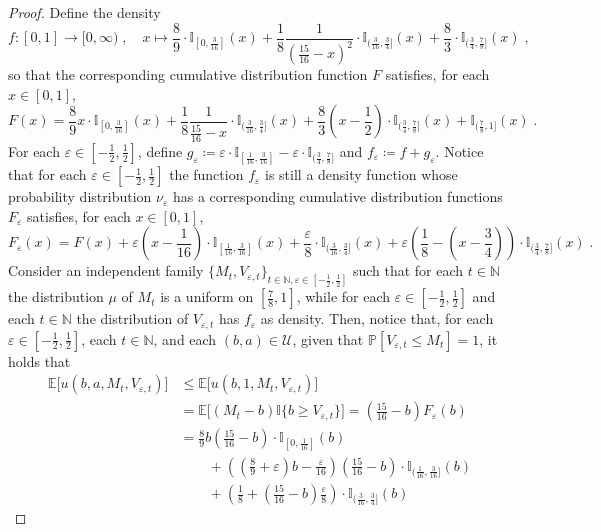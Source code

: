 \documentclass[final,12pt]{colt2025}
\newcommand{\cA}{\mathcal{A}}
\newcommand{\cS}{\mathcal{S}}
\newcommand{\cU}{\mathcal{U}}
\newcommand{\E}{\mathbb{E}}
\newcommand{\I}{\mathbb{I}}
\newcommand{\N}{\mathbb{N}}
\newcommand{\Pb}{\mathbb{P}}
\newcommand{\e}{\varepsilon}
\newcommand{\lrb}[1]{\left(#1\right)}
\newcommand{\lsb}[1]{\left[#1\right]}
\newcommand{\bsb}[1]{\bigl[#1\bigr]}
\newcommand{\one}[1]{\mathbb{I}\{#1\}}
\newcommand{\util}{u}
\newcommand{\nP}{M}
\newcommand{\nZ}{V}
\newcommand{\nb}{b}
\newcommand{\ns}{a}
\begin{document}
{
\begin{proof}
\renewcommand{\cA}{\mathscr{A}}
\renewcommand{\cS}{\mathcal{A}}
    Define the density
\[
    f \colon [0,1] \to [0,\infty)\;, \quad x \mapsto \frac{8}{9} \cdot \I_{[0, \frac{3}{16}]}(x) + \frac{1}{8}\frac{1}{\lrb{\frac{15}{16}-x}^2}\cdot\I_{(\frac{3}{16},\frac{3}{4}]}(x) + \frac{8}{3} \cdot \I_{(\frac{3}{4},\frac{7}{8}]}(x)\;,
\]
so that the corresponding cumulative distribution function $F$ satisfies, for each $x \in [0,1]$,
\[
    F(x)
=
    \frac{8}{9}x \cdot \I_{[0, \frac{3}{16}]}(x) + \frac{1}{8}  \frac{1}{\frac{15}{16}-x} \cdot \I_{(\frac{3}{16},\frac{3}{4}]}(x) + \frac{8}{3}\lrb{x-\frac{1}{2}}\cdot \I_{(\frac{3}{4},\frac{7}{8}]}(x) + \I_{(\frac{7}{8},1]}(x)\;.
\]
For each $\e \in [-\frac{1}{2},\frac{1}{2}]$, define
$
    g_\e
\coloneqq
    \e \cdot \I_{[\frac{1}{16},\frac{3}{16}]} - \e \cdot \I_{(\frac{3}{4},\frac{7}{8}]}
$
and $f_\e \coloneq f + g_\e$.
Notice that for each $\e \in [-\frac{1}{2},\frac{1}{2}]$ the function $f_\e$ is still a density function whose probability distribution $\nu_\e$ has a corresponding cumulative distribution functions $F_\e$ satisfies, for each $x \in [0,1]$,
\[
    F_\e(x)
=
    F(x)
    +
    \e \lrb{x - \frac{1}{16}} \cdot \I_{[\frac{1}{16}, \frac{3}{16}]}(x)
    +
    \frac{\e}{8} \cdot \I_{(\frac{3}{16},\frac{3}{4}]}(x)
    +
    \e \lrb{\frac{1}{8} - \lrb{x-\frac{3}{4}}} \cdot \I_{(\frac{3}{4},\frac{7}{8}]}(x)\;.
\]
Consider an independent family $\{\nP_t, \nZ_{\e,t}\}_{t \in \N, \e\in [-\frac{1}{2},\frac{1}{2}]}$ such that for each $t \in \N$ the distribution $\mu$ of $\nP_t$ is a uniform on $\lsb{\frac{7}{8},1}$, while for each $\e \in [-\frac{1}{2},\frac{1}{2}]$ and each $t \in \N$ the distribution of $\nZ_{\e,t}$ has $f_\e$ as density.
Then, notice that, for each $\e \in [-\frac{1}{2},\frac{1}{2}]$, each $t \in \N$, and each $(\nb, \ns) \in \cU$, given that $\Pb [ \nZ_{\e,t} \le \nP_t ] = 1$, it holds that
\begin{align*}
    \E\bsb{\util(\nb,\ns,\nP_t, \nZ_{\e,t})}
& \le
    \E\bsb{\util(\nb,1,\nP_t, \nZ_{\e,t})}
\\ & =
    \E\bsb{(\nP_t-\nb) \one{\nb \ge \nZ_{\e,t}}}
=
    \lrb{\frac{15}{16}-\nb}F_\e(\nb)
\\ &=
    \frac{8}{9}\nb\lrb{\frac{15}{16}-\nb} \cdot \I_{[0, \frac{1}{16}]}(\nb)
\\ & \qquad
    + \lrb{\lrb{\frac{8}{9}+\e}\nb-\frac{\e}{16}}\lrb{\frac{15}{16}-\nb} \cdot \I_{(\frac{1}{16},\frac{3}{16}]} (\nb)
\\ & \qquad
    + \lrb{\frac{1}{8}+\lrb{\frac{15}{16}-\nb}  \frac{\e}{8}} \cdot \I_{(\frac{3}{16},\frac{3}{4}]}(\nb)

\end{align*}
\end{proof}}
\end{document}
